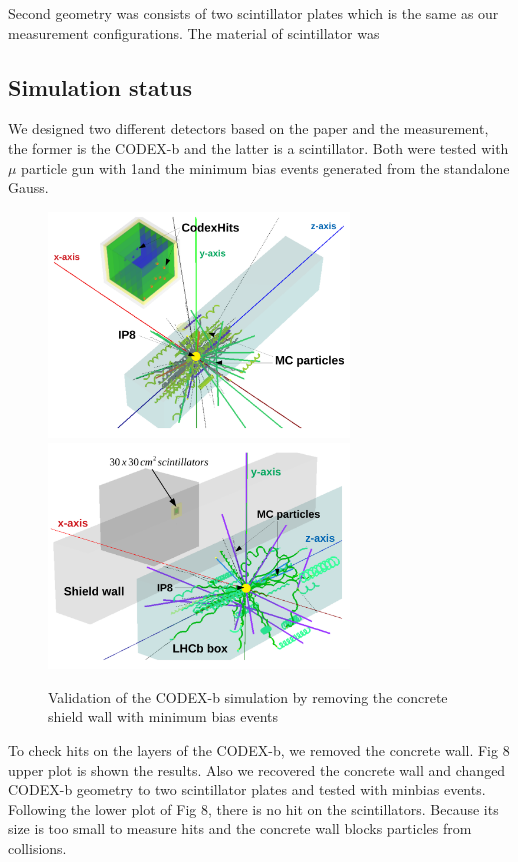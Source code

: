 Second geometry was consists of two scintillator plates which is the same as our measurement configurations.
The material of scintillator was  

\subsection{Simulation status}

We designed two different detectors based on the paper and the measurement, the former is the CODEX-b and the latter is a scintillator.
Both were tested with $\mu$ particle gun with 1\tev and the minimum bias events generated from the standalone Gauss. 

\begin{figure}[h]
\centering
    \includegraphics[width=8cm]{figs/INT/Minbias.pdf} \\
    \vspace{0.2cm} 
    \includegraphics[width=8cm]{figs/INT/Scint.pdf}
\caption{
    Validation of the CODEX-b simulation by removing the concrete shield wall with minimum bias events 
}
\end{figure}

To check hits on the layers of the CODEX-b, we removed the concrete wall. Fig 8 upper plot is shown the results.
Also we recovered the concrete wall and changed CODEX-b geometry to two scintillator plates and tested with minbias events.
Following the lower plot of Fig 8, there is no hit on the scintillators.
Because its size is too small to measure hits and the concrete wall blocks particles from collisions.

